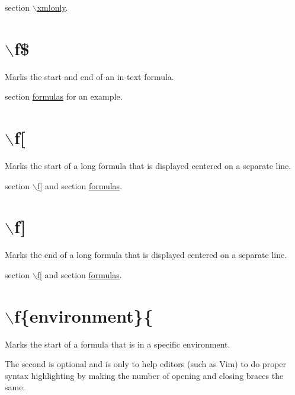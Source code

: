 \begin{Desc}
\item[See also:]section \hyperlink{commands_cmdxmlonly}{$\backslash$xmlonly}.\end{Desc}


 \hypertarget{commands_cmdfdollar}{}\section{$\backslash$f\$}\label{commands_cmdfdollar}

Marks the start and end of an in-text formula. \begin{Desc}
\item[See also:]section \hyperlink{formulas}{formulas} for an example.\end{Desc}


 \hypertarget{commands_cmdfbropen}{}\section{$\backslash$f\mbox{[}}\label{commands_cmdfbropen}
\index{\f[@{$\backslash$f[}}

Marks the start of a long formula that is displayed centered on a separate line. \begin{Desc}
\item[See also:]section \hyperlink{commands_cmdfbrclose}{$\backslash$f\mbox{]}} and section \hyperlink{formulas}{formulas}.\end{Desc}


 \hypertarget{commands_cmdfbrclose}{}\section{$\backslash$f\mbox{]}}\label{commands_cmdfbrclose}
\index{\f]@{$\backslash$f]}}

Marks the end of a long formula that is displayed centered on a separate line. \begin{Desc}
\item[See also:]section \hyperlink{commands_cmdfbropen}{$\backslash$f\mbox{[}} and section \hyperlink{formulas}{formulas}.\end{Desc}


 \hypertarget{commands_cmdfcurlyopen}{}\section{$\backslash$f\{environment\}\{}\label{commands_cmdfcurlyopen}
Marks the start of a formula that is in a specific environment. \begin{Desc}
\item[Note:]The second is optional and is only to help editors (such as Vim) to do proper syntax highlighting by making the number of opening and closing braces the same.\end{Desc}


